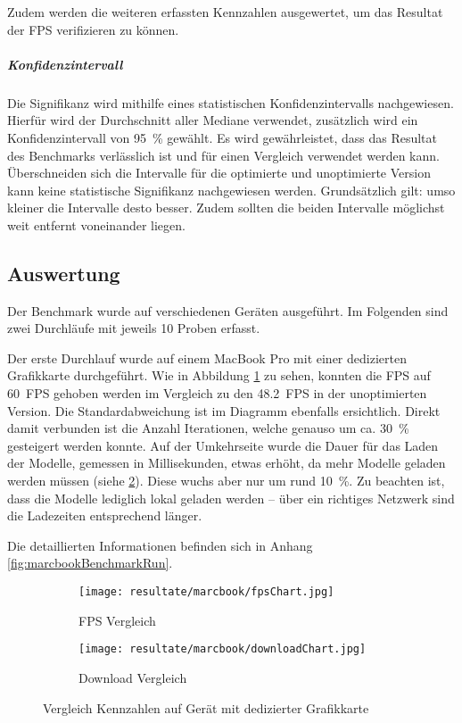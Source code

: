 Zudem werden die weiteren erfassten Kennzahlen ausgewertet, um das Resultat der \gls{FPS} verifizieren zu können.

\subparagraph{Konfidenzintervall}
Die Signifikanz wird mithilfe eines statistischen Konfidenzintervalls nachgewiesen. Hierfür wird der Durchschnitt aller Mediane verwendet, zusätzlich wird ein Konfidenzintervall von 95 \% gewählt. Es wird gewährleistet, dass das Resultat des Benchmarks verlässlich ist und für einen Vergleich verwendet werden kann. Überschneiden sich die Intervalle für die optimierte und unoptimierte Version kann keine statistische Signifikanz nachgewiesen werden. Grundsätzlich gilt: umso kleiner die Intervalle desto besser. Zudem sollten die beiden Intervalle möglichst weit entfernt voneinander liegen.

\subsection{Auswertung}
\label{chap:benchmarkResults}

Der Benchmark wurde auf verschiedenen Geräten ausgeführt. Im Folgenden sind zwei Durchläufe mit jeweils 10 Proben erfasst.

Der erste Durchlauf wurde auf einem MacBook Pro mit einer dedizierten Grafikkarte durchgeführt. Wie in Abbildung \ref{fig:benchmarkFpsChartMarcbook} zu sehen, konnten die FPS auf 60 FPS gehoben werden im Vergleich zu den 48.2 FPS in der unoptimierten Version. Die Standardabweichung ist im Diagramm ebenfalls ersichtlich.
Direkt damit verbunden ist die Anzahl  Iterationen, welche genauso um ca. 30 \% gesteigert werden konnte. Auf der Umkehrseite wurde die Dauer für das Laden der Modelle, gemessen in Millisekunden, etwas erhöht, da mehr Modelle geladen werden müssen (siehe \ref{fig:benchmarkDownloadChartMarcbook}). Diese wuchs aber nur um rund 10 \%. Zu beachten ist, dass die Modelle lediglich lokal geladen werden – über ein richtiges Netzwerk sind die Ladezeiten entsprechend länger.

Die detaillierten Informationen befinden sich in Anhang \ref{fig:marcbookBenchmarkRun}.

\begin{figure}[H]
  \centering
  \begin{subfigure}{.49\textwidth}
    \centering
    \texttt{[image: resultate/marcbook/fpsChart.jpg]}
    \caption{FPS Vergleich}
    \label{fig:benchmarkFpsChartMarcbook}
  \end{subfigure}
  \begin{subfigure}{.49\textwidth}
    \centering
    \texttt{[image: resultate/marcbook/downloadChart.jpg]}
    \caption{Download Vergleich}
    \label{fig:benchmarkDownloadChartMarcbook}
  \end{subfigure}
  \caption{Vergleich Kennzahlen auf Gerät mit dedizierter Grafikkarte}
  \label{fig:benchmarkChartMarcbook}
\end{figure}

